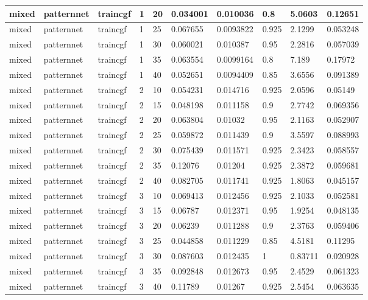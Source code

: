 \begin{longtable}{lllllllll}
mixed & patternnet & traincgf & 1 & 20 & 0.034001 & 0.010036 & 0.8 & 5.0603 & 0.12651 \\ \hline 
mixed & patternnet & traincgf & 1 & 25 & 0.067655 & 0.0093822 & 0.925 & 2.1299 & 0.053248 \\ \hline 
mixed & patternnet & traincgf & 1 & 30 & 0.060021 & 0.010387 & 0.95 & 2.2816 & 0.057039 \\ \hline 
mixed & patternnet & traincgf & 1 & 35 & 0.063554 & 0.0099164 & 0.8 & 7.189 & 0.17972 \\ \hline 
mixed & patternnet & traincgf & 1 & 40 & 0.052651 & 0.0094409 & 0.85 & 3.6556 & 0.091389 \\ \hline 
mixed & patternnet & traincgf & 2 & 10 & 0.054231 & 0.014716 & 0.925 & 2.0596 & 0.05149 \\ \hline 
mixed & patternnet & traincgf & 2 & 15 & 0.048198 & 0.011158 & 0.9 & 2.7742 & 0.069356 \\ \hline 
mixed & patternnet & traincgf & 2 & 20 & 0.063804 & 0.01032 & 0.95 & 2.1163 & 0.052907 \\ \hline 
mixed & patternnet & traincgf & 2 & 25 & 0.059872 & 0.011439 & 0.9 & 3.5597 & 0.088993 \\ \hline 
mixed & patternnet & traincgf & 2 & 30 & 0.075439 & 0.011571 & 0.925 & 2.3423 & 0.058557 \\ \hline 
mixed & patternnet & traincgf & 2 & 35 & 0.12076 & 0.01204 & 0.925 & 2.3872 & 0.059681 \\ \hline 
mixed & patternnet & traincgf & 2 & 40 & 0.082705 & 0.011741 & 0.925 & 1.8063 & 0.045157 \\ \hline 
mixed & patternnet & traincgf & 3 & 10 & 0.069413 & 0.012456 & 0.925 & 2.1033 & 0.052581 \\ \hline 
mixed & patternnet & traincgf & 3 & 15 & 0.06787 & 0.012371 & 0.95 & 1.9254 & 0.048135 \\ \hline 
mixed & patternnet & traincgf & 3 & 20 & 0.06239 & 0.011288 & 0.9 & 2.3763 & 0.059406 \\ \hline 
mixed & patternnet & traincgf & 3 & 25 & 0.044858 & 0.011229 & 0.85 & 4.5181 & 0.11295 \\ \hline 
mixed & patternnet & traincgf & 3 & 30 & 0.087603 & 0.012435 & 1 & 0.83711 & 0.020928 \\ \hline 
mixed & patternnet & traincgf & 3 & 35 & 0.092848 & 0.012673 & 0.95 & 2.4529 & 0.061323 \\ \hline 
mixed & patternnet & traincgf & 3 & 40 & 0.11789 & 0.01267 & 0.925 & 2.5454 & 0.063635 \\ \hline 

\end{longtable}
